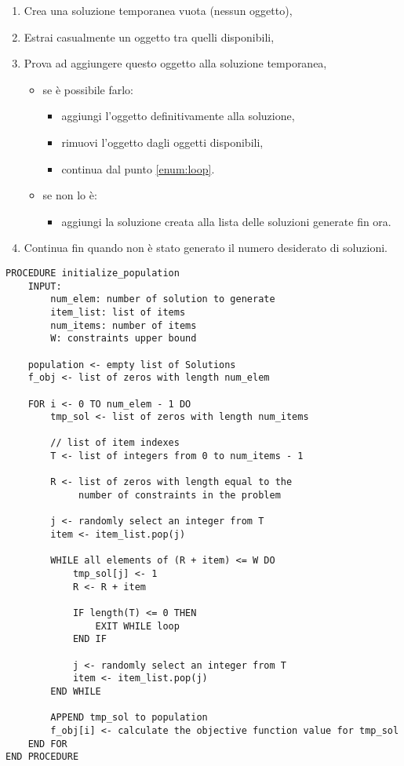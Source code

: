 \begin{enumerate}
    \item Crea una soluzione temporanea vuota (nessun oggetto),
    \item Estrai casualmente un oggetto tra quelli disponibili, \label{enum:loop}
    \item Prova ad aggiungere questo oggetto alla soluzione temporanea, \label{enum:check}
          \begin{itemize}
              \item se è possibile farlo: \begin{itemize}
                        \item aggiungi l'oggetto definitivamente alla soluzione,
                        \item rimuovi l'oggetto dagli oggetti disponibili,
                        \item continua dal punto \ref{enum:loop}.
                    \end{itemize}
              \item se non lo è: \begin{itemize}
                        \item aggiungi la soluzione creata alla lista delle
                              soluzioni generate fin ora.
                    \end{itemize}
          \end{itemize}
    \item Continua fin quando non è stato generato il numero desiderato di soluzioni.
\end{enumerate}

\begin{lstlisting}[caption={Pseudocodice per la Selezione della Popolazione iniziale.}]
PROCEDURE initialize_population
    INPUT:
        num_elem: number of solution to generate
        item_list: list of items
        num_items: number of items
        W: constraints upper bound

    population <- empty list of Solutions
    f_obj <- list of zeros with length num_elem

    FOR i <- 0 TO num_elem - 1 DO
        tmp_sol <- list of zeros with length num_items

        // list of item indexes
        T <- list of integers from 0 to num_items - 1

        R <- list of zeros with length equal to the
             number of constraints in the problem

        j <- randomly select an integer from T
        item <- item_list.pop(j)

        WHILE all elements of (R + item) <= W DO
            tmp_sol[j] <- 1
            R <- R + item

            IF length(T) <= 0 THEN
                EXIT WHILE loop
            END IF

            j <- randomly select an integer from T
            item <- item_list.pop(j)
        END WHILE

        APPEND tmp_sol to population
        f_obj[i] <- calculate the objective function value for tmp_sol
    END FOR
END PROCEDURE
\end{lstlisting}

